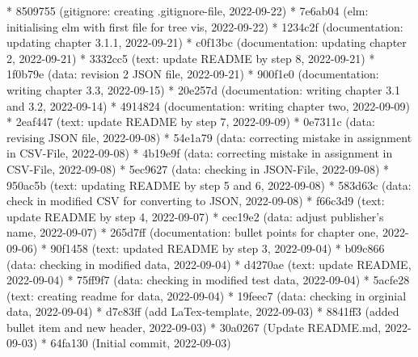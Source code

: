 \documentclass[usegeometry=true]{scrartcl}
\begin{document}
* 8509755 (gitignore: creating .gitignore-file, 2022-09-22)\newline
* 7e6ab04 (elm: initialising elm with first file for tree vis, 2022-09-22)\newline
* 1234c2f (documentation: updating chapter 3.1.1, 2022-09-21)\newline
* c0f13bc (documentation: updating chapter 2, 2022-09-21)\newline
* 3332cc5 (text: update README by step 8, 2022-09-21)\newline
* 1f0b79e (data: revision 2 JSON file, 2022-09-21)\newline
* 900f1e0 (documentation: writing chapter 3.3, 2022-09-15)\newline
* 20e257d (documentation: writing chapter 3.1 and 3.2, 2022-09-14)\newline
* 4914824 (documentation: writing chapter two, 2022-09-09)\newline
* 2eaf447 (text: update README by step 7, 2022-09-09)\newline
* 0e7311c (data: revising JSON file, 2022-09-08)\newline
* 54e1a79 (data: correcting mistake in assignment in CSV-File, 2022-09-08)\newline
* 4b19e9f (data: correcting mistake in assignment in CSV-File, 2022-09-08)\newline
* 5ec9627 (data: checking in JSON-File, 2022-09-08)\newline
* 950ac5b (text: updating README by step 5 and 6, 2022-09-08) \newline
* 583d63c (data: check in modified CSV for converting to JSON, 2022-09-08) \newline
* f66c3d9 (text: update README by step 4, 2022-09-07)\newline
* cec19e2 (data: adjust publisher's name, 2022-09-07)\newline
* 265d7ff (documentation: bullet points for chapter one, 2022-09-06)\newline
* 90f1458 (text: updated README by step 3, 2022-09-04)\newline
* b09c866 (data: checking in modified data, 2022-09-04)\newline
* d4270ae (text: update README, 2022-09-04)\newline
* 75ff9f7 (data: checking in modified test data, 2022-09-04)\newline
* 5acfe28 (text: creating readme for data, 2022-09-04)\newline
* 19feec7 (data: checking in orginial data, 2022-09-04)\newline
* d7c83ff (add LaTex-template, 2022-09-03)\newline
* 8841ff3 (added bullet item and new header, 2022-09-03)\newline
* 30a0267 (Update README.md, 2022-09-03)\newline
* 64fa130 (Initial commit, 2022-09-03)\newline
\newpage
\printbibliography
\end{document}
